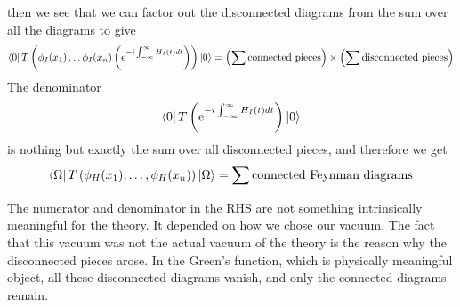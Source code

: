 \documentclass[11pt, notitlepage]{report}
\newcommand{\e}{\mathrm{e}}
\numberwithin{equation}{section}
\begin{document}
then we see that we can factor out the disconnected diagrams from the sum over all the diagrams to give 
\begin{equation*}
    \bra{0}T\left( \phi_I(x_1)\ldots\phi_I(x_n) \left(\e^{-i\int_{-\infty}^{\infty}H_I(t) dt }\right) \right) \ket{0} = \left( \sum \text{connected pieces}  \right) \times \left( \sum \text{disconnected pieces}  \right)
\end{equation*}
The denominator 
\begin{equation*}
    \bra{0}T\left( \e^{-i\int_{-\infty}^{\infty}H_I(t) dt }\right) \ket{0}
\end{equation*}
is nothing but exactly the sum over all disconnected pieces, and therefore we get 
\begin{equation*}
    \bra{\Omega} T\left( \phi_H(x_1),\ldots,\phi_H(x_n)  \right) \ket{\Omega} = \sum \text{connected Feynman diagrams} 
\end{equation*}

The numerator and denominator in the RHS are not something intrinsically meaningful for the theory. It depended on how we chose our vacuum. The fact that this vacuum was not the actual vacuum of the theory is the reason why the disconnected pieces arose. In the Green's function, which is physically meaningful object, all these disconnected diagrams vanish, and only the connected diagrams remain.
\end{document}
